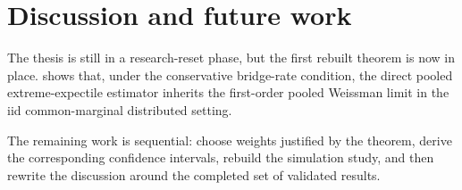\chapter{Discussion and future work}
\label{ch:discussion}

The thesis is still in a research-reset phase, but the first rebuilt
theorem is now in place.  shows that,
under the conservative bridge-rate condition, the direct pooled
extreme-expectile estimator inherits the first-order pooled Weissman
limit in the iid common-marginal distributed setting.

The remaining work is sequential: choose weights justified by the
theorem, derive the corresponding confidence intervals, rebuild the
simulation study, and then rewrite the discussion around the completed
set of validated results.
